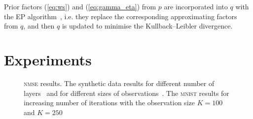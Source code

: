 \documentclass{article}
\begin{document}
  Prior factors (\ref{eq:ws}) and (\ref{eq:gamma_eta}) from $p$ are incorporated into $q$ with the EP algorithm~\cite{hernandez2015probabilistic}, i.e. they replace the corresponding approximating factors from $q$, and then $q$ is updated to minimise the Kullback--Leibler divergence.

  \section{Experiments}
  \label{sec:experiments}

   \begin{figure}[!t]
  \centering
  \hfil
  \hfil
  \hfil
  \caption{\textsc{nmse} results. The synthetic data results for different number of layers~\protect{} and for different sizes of observations~\protect{}. The \textsc{mnist} results for increasing number of iterations with the observation size $K = 100$~\protect{} and $K = 250$~\protect{}}
  \label{fig:number_of_layers_synthetic}
  \end{figure}
\end{document}
